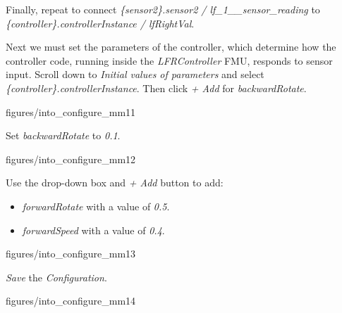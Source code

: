 \documentclass[11pt,a4paper]{../tutorial}
\begin{document}
\begin{instructions}
\item Finally, repeat to connect \emph{\{sensor2\}.sensor2 / lf\_1\_\_sensor\_reading} to \emph{\{controller\}.controllerInstance / lfRightVal}.

\item Next we must set the parameters of the controller, which determine how the controller code, running inside the \emph{LFRController} FMU, responds to sensor input. Scroll down to \emph{Initial values of parameters} and select \emph{\{controller\}.controllerInstance}. Then click \emph{+ Add} for \emph{backwardRotate}.

    \begin{annotation}[width=0.8\linewidth]{figures/into_configure_mm11}
    \end{annotation}

\newpage
\item Set \emph{backwardRotate} to \emph{0.1}.

    \begin{annotation}[width=0.8\linewidth,trim=0 0 0 0,clip]{figures/into_configure_mm12}
    \end{annotation}

\item Use the drop-down box and \emph{+ Add} button to add:
    \begin{itemize}
      \item \emph{forwardRotate} with a value of \emph{0.5}.
      \item \emph{forwardSpeed} with a value of \emph{0.4}.
    \end{itemize}

    \begin{annotation}[width=0.8\linewidth,trim=0 0 0 0,clip]{figures/into_configure_mm13}
    \end{annotation}

\newpage
\item \emph{Save} the \emph{Configuration}.

    \begin{annotation}[width=0.8\linewidth,trim=0 0 0 250,clip]{figures/into_configure_mm14}
    \end{annotation}


\end{instructions}
\end{document}
